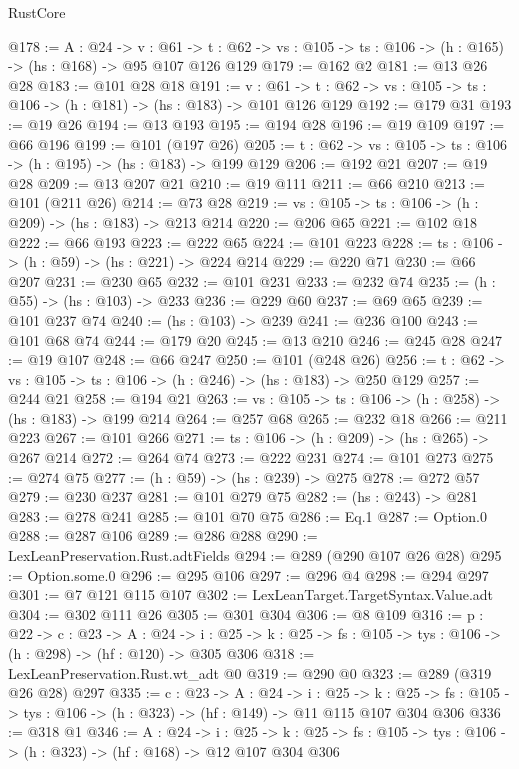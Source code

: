 \begin{lexlean}{RustCore}
\begin{coremodule}
@178 := {A : @24} ->
  {v : @61} ->
  {t : @62} -> {vs : @105} -> {ts : @106} -> (h : @165) -> (hs : @168) -> @95 @107 @126 @129
@179 := @162 @2
@181 := @13 @26 @28
@183 := @101 @28 @18
@191 := {v : @61} ->
  {t : @62} -> {vs : @105} -> {ts : @106} -> (h : @181) -> (hs : @183) -> @101 @126 @129
@192 := @179 @31
@193 := @19 @26
@194 := @13 @193
@195 := @194 @28
@196 := @19 @109
@197 := @66 @196
@199 := @101 (@197 @26)
@205 := {t : @62} -> {vs : @105} -> {ts : @106} -> (h : @195) -> (hs : @183) -> @199 @129
@206 := @192 @21
@207 := @19 @28
@209 := @13 @207 @21
@210 := @19 @111
@211 := @66 @210
@213 := @101 (@211 @26)
@214 := @73 @28
@219 := {vs : @105} -> {ts : @106} -> (h : @209) -> (hs : @183) -> @213 @214
@220 := @206 @65
@221 := @102 @18
@222 := @66 @193
@223 := @222 @65
@224 := @101 @223
@228 := {ts : @106} -> (h : @59) -> (hs : @221) -> @224 @214
@229 := @220 @71
@230 := @66 @207
@231 := @230 @65
@232 := @101 @231
@233 := @232 @74
@235 := (h : @55) -> (hs : @103) -> @233
@236 := @229 @60
@237 := @69 @65
@239 := @101 @237 @74
@240 := (hs : @103) -> @239
@241 := @236 @100
@243 := @101 @68 @74
@244 := @179 @20
@245 := @13 @210
@246 := @245 @28
@247 := @19 @107
@248 := @66 @247
@250 := @101 (@248 @26)
@256 := {t : @62} -> {vs : @105} -> {ts : @106} -> (h : @246) -> (hs : @183) -> @250 @129
@257 := @244 @21
@258 := @194 @21
@263 := {vs : @105} -> {ts : @106} -> (h : @258) -> (hs : @183) -> @199 @214
@264 := @257 @68
@265 := @232 @18
@266 := @211 @223
@267 := @101 @266
@271 := {ts : @106} -> (h : @209) -> (hs : @265) -> @267 @214
@272 := @264 @74
@273 := @222 @231
@274 := @101 @273
@275 := @274 @75
@277 := (h : @59) -> (hs : @239) -> @275
@278 := @272 @57
@279 := @230 @237
@281 := @101 @279 @75
@282 := (hs : @243) -> @281
@283 := @278 @241
@285 := @101 @70 @75
@286 := Eq.{1}
@287 := Option.{0}
@288 := @287 @106
@289 := @286 @288
@290 := LexLeanPreservation.Rust.adtFields
@294 := @289 (@290 @107 @26 @28)
@295 := Option.some.{0}
@296 := @295 @106
@297 := @296 @4
@298 := @294 @297
@301 := @7 @121 @115 @107
@302 := LexLeanTarget.TargetSyntax.Value.adt
@304 := @302 @111 @26
@305 := @301 @304
@306 := @8 @109
@316 := {p : @22} ->
  {c : @23} ->
  {A : @24} ->
  {i : @25} -> {k : @25} -> {fs : @105} -> {tys : @106} -> (h : @298) -> (hf : @120) -> @305 @306
@318 := LexLeanPreservation.Rust.wt_adt @0
@319 := @290 @0
@323 := @289 (@319 @26 @28) @297
@335 := {c : @23} ->
  {A : @24} ->
  {i : @25} ->
  {k : @25} -> {fs : @105} -> {tys : @106} -> (h : @323) -> (hf : @149) -> @11 @115 @107 @304 @306
@336 := @318 @1
@346 := {A : @24} ->
  {i : @25} ->
  {k : @25} -> {fs : @105} -> {tys : @106} -> (h : @323) -> (hf : @168) -> @12 @107 @304 @306

\end{coremodule}
\end{lexlean}
